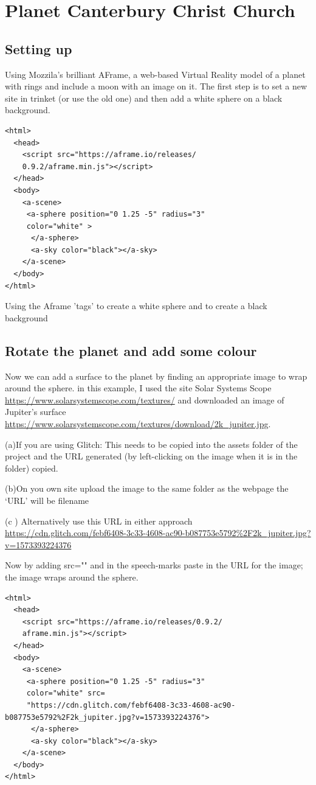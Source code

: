 \chapter{Planet Canterbury Christ Church}
\section{Setting up}
Using Mozzila's brilliant AFrame, a web-based Virtual Reality model of a planet with rings and include a moon with an image on it.
The first step is to set a new site in trinket (or use the old one)  and then add a white sphere on a black background.
\begin{lstlisting}
<html>
  <head>
    <script src="https://aframe.io/releases/
    0.9.2/aframe.min.js"></script>
  </head>
  <body>
    <a-scene>
     <a-sphere position="0 1.25 -5" radius="3" 
     color="white" >
      </a-sphere>   
      <a-sky color="black"></a-sky>
    </a-scene>
  </body>
</html>
\end{lstlisting}

Using the Aframe 'tags' to create a white sphere and to create a black background

\section{Rotate the planet and add some colour}
Now we can add a surface to the planet by finding an appropriate image to wrap around the sphere. in this example, I used the site Solar Systems Scope \url{https://www.solarsystemscope.com/textures/} and downloaded an image of Jupiter's surface \url{https://www.solarsystemscope.com/textures/download/2k_jupiter.jpg}.

 

(a)If you are using Glitch: This needs to be copied into the assets folder of the project and the URL generated (by left-clicking on the image when it is in the folder) copied.

(b)On you own site upload the image to the same folder as the webpage the ‘URL’ will be filename

(c ) Alternatively use this URL in either approach \url{https://cdn.glitch.com/febf6408-3c33-4608-ac90-b087753e5792%2F2k_jupiter.jpg?v=1573393224376}

Now by adding src="" and in the speech-marks paste in the URL for the image; the image wraps around the sphere.
\begin{lstlisting}
<html>
  <head>
    <script src="https://aframe.io/releases/0.9.2/
    aframe.min.js"></script>
  </head>
  <body>
    <a-scene>
     <a-sphere position="0 1.25 -5" radius="3" 
     color="white" src=
     "https://cdn.glitch.com/febf6408-3c33-4608-ac90-b087753e5792%2F2k_jupiter.jpg?v=1573393224376">
      </a-sphere>   
      <a-sky color="black"></a-sky>
    </a-scene>
  </body>
</html>
\end{lstlisting}

